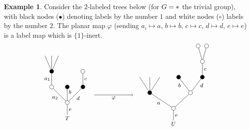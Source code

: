 \documentclass[a4paper,10pt
,draft
]{article}%
\numberwithin{equation}{section}
\numberwithin{figure}{section}
\theoremstyle{definition} %
\newtheorem{example}[equation]{Example}%
\newcommand{\1}{\ensuremath{\mathbbm 1}}%
\begin{document}
\begin{example}\label{LABELEDTREES EX}
Consider the $2$-labeled trees below (for $G=\**$ the trivial group), with black nodes ($\bullet$) denoting labels by the number $1$ and white nodes ($\circ$) labels by the number $2$.
The planar map $\varphi$ (sending $a_i\mapsto a$, 
$b \mapsto b$, $c \mapsto c$, $d \mapsto d$, $e \mapsto e$) is a label map which is $\{1\}$-inert.
\[
	\begin{tikzpicture}[grow=up,auto,level distance=2.1em,
	every node/.style = {font=\footnotesize,inner sep=2pt},
	dummy/.style={circle,draw,inner sep=0pt,
	minimum size=2.1mm}]
	\begin{scope}[level distance=2.3em]
	\tikzstyle{level 2}=[sibling distance=3.5em]%
	\tikzstyle{level 3}=[sibling distance=2.25em]%
	\tikzstyle{level 4}=[sibling distance=1.25em]%
	\tikzstyle{level 5}=[sibling distance=1.25em]%
		\node at (5.5,0) {$U$}
			child{node [dummy] {}
				child[sibling distance =5em]{node [dummy] {}
					child[sibling distance =3.5em]{node [dummy,fill=black] {}
						child{node [dummy] {}
							child{node [dummy] {}}
							child{node [dummy] {}}
						edge from parent node [swap] {$c$}}
					edge from parent node [swap, near end] {$d$}}
					child[sibling distance =3.5em]{node [dummy,fill=black] {}
					edge from parent node [near end] {$b$}}
				}
				child[sibling distance =7em]{node [dummy,fill=black] {}
					child[sibling distance =1.5em]
					child[sibling distance =1.5em]
					child[sibling distance =1.5em]
				edge from parent node {$a$}}
			edge from parent node [swap] {$e$}};
	\end{scope}
	\begin{scope}[level distance=2.3em]
	\tikzstyle{level 2}=[sibling distance=2.3em]%
	\tikzstyle{level 4}=[sibling distance=1em]%
		\node at (0,0.3) {$T$}
			child{node [dummy] {}
				child{node [dummy,fill=black] {}
					child{node [dummy] {}
					edge from parent node [swap] {$c$}}	
				edge from parent node [swap] {$d$}}
				child{node [dummy,fill=black] {}
				edge from parent node [near end,swap] {$b$}}
				child{node [dummy] {}
					child{node [dummy,fill=black] {}
						child
						child
						child
					edge from parent node {$a_1$}}
				edge from parent node {$a_2$}}
			edge from parent node [swap] {$e$}};
	\end{scope}
	\draw [->] (1.4,1.5) -- node[swap] {$\varphi$} (3.4,1.5);
	\end{tikzpicture}
\]
\end{example}
\end{document}
